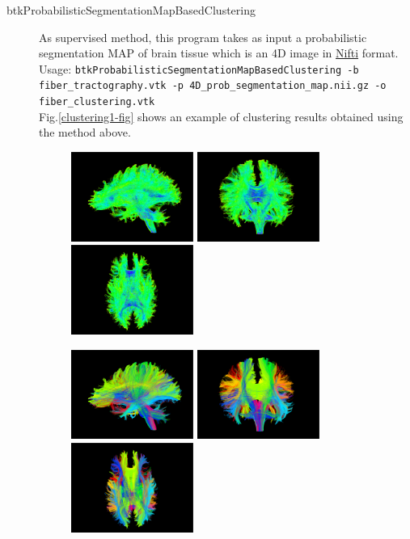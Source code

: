 \begin{description}
        \item[btkProbabilisticSegmentationMapBasedClustering] As supervised method, this program takes as input a probabilistic segmentation MAP of brain tissue which is an 4D image in \href{http://nifti.nimh.nih.gov/nifti-1}{Nifti} format.\\

	Usage: \texttt{btkProbabilisticSegmentationMapBasedClustering -b fiber\_tractography.vtk -p 4D\_prob\_segmentation\_map.nii.gz -o fiber\_clustering.vtk}\\
 
	Fig.\ref{clustering1-fig} shows an example of clustering results obtained using the method above.

	\begin{figure}[h]
	\centering
        \includegraphics[width=4cm]{Tarctography1-Left-View}
        \includegraphics[width=4cm]{Tarctography1-Anterior-View}
        \includegraphics[width=4cm]{Tarctography1-Interior-View}

        \includegraphics[width=4cm]{Clustering1-Left-View}
        \includegraphics[width=4cm]{Clustering1-Anterior-View}
        \includegraphics[width=4cm]{Clustering1-Interior-View}


\end{figure}
\end{description}
